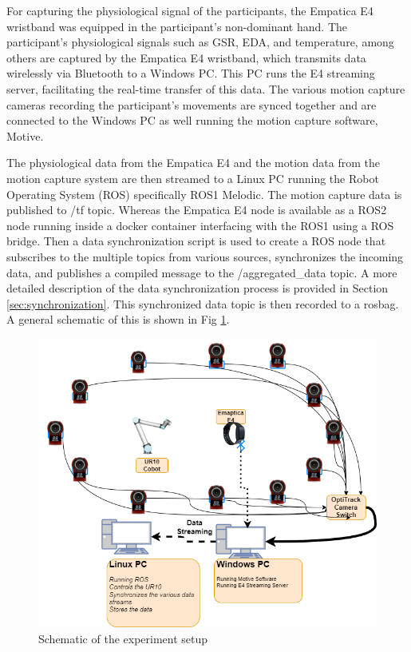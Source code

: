 For capturing the physiological signal of the participants, the Empatica E4 wristband was equipped in the participant's non-dominant hand. The participant's physiological signals such as \gls{GSR}, \gls{EDA},  and temperature, among others are captured by the Empatica E4 wristband, which transmits data wirelessly via Bluetooth to a Windows PC. This PC runs the E4 streaming server, facilitating the real-time transfer of this data. The various motion capture cameras recording the participant's movements are synced  together and are connected to the Windows PC as well running the motion capture software, Motive. 

The physiological data from the Empatica E4 and the motion data from the motion capture system are then streamed to a Linux PC running the Robot Operating System (ROS) specifically ROS1 Melodic.
The motion capture data is published to /tf topic. Whereas the Empatica E4 node is available as a ROS2 node running inside a docker container interfacing with the ROS1 using a ROS bridge.
Then a data synchronization script is used to create a ROS node that subscribes to the multiple topics from various sources, synchronizes the incoming data, and publishes a compiled message to the /aggregated\_data topic. A more detailed description of the data synchronization process is provided in Section \ref{sec:synchronization}.
This synchronized data topic is then recorded to a rosbag. A general schematic of this is shown in Fig \ref{fig:netwrok}.


\begin{figure}[h]
	\centering
	\includegraphics[width=0.8\columnwidth]{images/network3.png}
	\caption{Schematic of the experiment setup}
	\label{fig:netwrok}
\end{figure}

